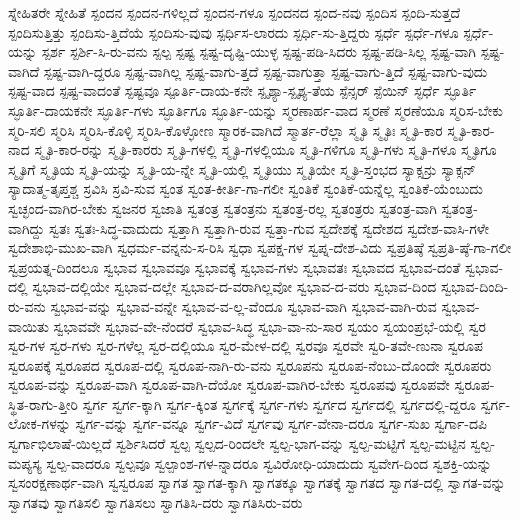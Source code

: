 {ಸ್ನೇಹಿತರೇ
ಸ್ನೇಹಿತೆ
ಸ್ಪಂದನ
ಸ್ಪಂದನ-ಗಳಿಲ್ಲದೆ
ಸ್ಪಂದನ-ಗಳೂ
ಸ್ಪಂದನದ
ಸ್ಪಂದ-ನವು
ಸ್ಪಂದಿಸ
ಸ್ಪಂದಿ-ಸುತ್ತದೆ
ಸ್ಪಂದಿಸುತ್ತಿತ್ತು
ಸ್ಪಂದಿಸು-ತ್ತಿದೆಯೆ
ಸ್ಪಂದಿಸು-ವುವು
ಸ್ಪರ್ಧಿಸ-ಲಾರದು
ಸ್ಪರ್ಧಿ-ಸು-ತ್ತಿದ್ದರು
ಸ್ಪರ್ಧೆ
ಸ್ಪರ್ಧೆ-ಗಳೂ
ಸ್ಪರ್ಧೆ-ಯನ್ನು
ಸ್ಪರ್ಶ
ಸ್ಪರ್ಶಿ-ಸಿ-ರು-ವನು
ಸ್ಪಲ್ಪ
ಸ್ಪಷ್ಟ
ಸ್ಪಷ್ಟ-ದೃಷ್ಟಿ-ಯುಳ್ಳ
ಸ್ಪಷ್ಟ-ಪಡಿ-ಸಿದರು
ಸ್ಪಷ್ಟ-ಪಡಿ-ಸಿಲ್ಲ
ಸ್ಪಷ್ಟ-ವಾಗಿ
ಸ್ಪಷ್ಟ-ವಾಗಿದೆ
ಸ್ಪಷ್ಟ-ವಾಗಿ-ದ್ದರೂ
ಸ್ಪಷ್ಟ-ವಾಗಿಲ್ಲ
ಸ್ಪಷ್ಟ-ವಾಗು-ತ್ತದೆ
ಸ್ಪಷ್ಟ-ವಾಗುತ್ತಾ
ಸ್ಪಷ್ಟ-ವಾಗು-ತ್ತಿದೆ
ಸ್ಪಷ್ಟ-ವಾಗು-ವುದು
ಸ್ಪಷ್ಟ-ವಾದ
ಸ್ಪಷ್ಟ-ವಾದಂತೆ
ಸ್ಪಷ್ಟವೂ
ಸ್ಪೂರ್ತಿ-ದಾಯ-ಕನೇ
ಸ್ಪೃಶ್ಯಾ-ಸ್ಪೃಶ್ಯ-ತೆಯ
ಸ್ಪೆನ್ಸರ್
ಸ್ಪೆಯಿನ್
ಸ್ಫರ್ಧೆ
ಸ್ಫೂರ್ತಿ
ಸ್ಫೂರ್ತಿ-ದಾಯಕನೇ
ಸ್ಫೂರ್ತಿ-ಗಳು
ಸ್ಫೂರ್ತಿಗೂ
ಸ್ಫೂರ್ತಿ-ಯನ್ನು
ಸ್ಮರಣಾರ್ಹ-ವಾದ
ಸ್ಮರಣೆ
ಸ್ಮರಣೆಯೂ
ಸ್ಮರಿಸ-ಬೇಕು
ಸ್ಮರಿ-ಸಲಿ
ಸ್ಮರಿಸಿ
ಸ್ಮರಿಸಿ-ಕೊಳ್ಳಿ
ಸ್ಮರಿಸಿ-ಕೊಳ್ಳೋಣ
ಸ್ಮಾರಕ-ವಾಗಿದೆ
ಸ್ಮಾರ್ತ-ರೆಲ್ಲಾ
ಸ್ಮೃತಿ
ಸ್ಮೃತಿಃ
ಸ್ಮೃತಿ-ಕಾರ
ಸ್ಮೃತಿ-ಕಾರ-ನಾದ
ಸ್ಮೃತಿ-ಕಾರ-ರನ್ನು
ಸ್ಮೃತಿ-ಕಾರರು
ಸ್ಮೃತಿ-ಗಳಲ್ಲಿ
ಸ್ಮೃತಿ-ಗಳಲ್ಲಿಯೂ
ಸ್ಮೃತಿ-ಗಳಿಗೂ
ಸ್ಮೃತಿ-ಗಳು
ಸ್ಮೃತಿ-ಗಳೂ
ಸ್ಮೃತಿಗೂ
ಸ್ಮೃತಿಗೆ
ಸ್ಮೃತಿಯ
ಸ್ಮೃತಿ-ಯನ್ನು
ಸ್ಮೃತಿ-ಯ-ನ್ನೇ
ಸ್ಮೃತಿ-ಯಲ್ಲಿ
ಸ್ಮೃತಿಯು
ಸ್ಮೃತಿಯೇ
ಸ್ಮೃತಿ-ಸ್ತಂಭದ
ಸ್ಯಾಕ್ಸನ್ರು
ಸ್ಯಾಕ್ಸನ್
ಸ್ಯಾದಾತ್ಮ-ತೃಪ್ತಶ್ಚ
ಸ್ರವಿಸಿ
ಸ್ರವಿ-ಸುವ
ಸ್ವಂತ
ಸ್ವಂತ-ಕೀರ್ತಿ-ಗಾ-ಗಲೀ
ಸ್ವಂತಿಕೆ
ಸ್ವಂತಿಕೆ-ಯನ್ನೆಲ್ಲ
ಸ್ವಂತಿಕೆ-ಯೆಂಬುದು
ಸ್ವಚ್ಛಂದ-ವಾಗಿರ-ಬೇಕು
ಸ್ವಜನರ
ಸ್ವಜಾತಿ
ಸ್ವತಂತ್ರ
ಸ್ವತಂತ್ರನು
ಸ್ವತಂತ್ರ-ರಲ್ಲ
ಸ್ವತಂತ್ರರು
ಸ್ವತಂತ್ರ-ವಾಗಿ
ಸ್ವತಂತ್ರ-ವಾಗಿದ್ದು
ಸ್ವತಃ
ಸ್ವತಃ-ಸಿದ್ಧ-ವಾದುದು
ಸ್ವತ್ತಾಗಿ
ಸ್ವತ್ತಾಗಿ-ರುವ
ಸ್ವತ್ತಾ-ಗುವ
ಸ್ವದೇಶಕ್ಕೆ
ಸ್ವದೇಶದ
ಸ್ವದೇಶ-ವಾಸಿ-ಗಳೇ
ಸ್ವದೇಶಾಭಿ-ಮುಖ-ವಾಗಿ
ಸ್ವಧರ್ಮ-ವನ್ನನು-ಸ-ರಿಸಿ
ಸ್ವಧಾ
ಸ್ವಪಕ್ಷ-ಗಳ
ಸ್ವಪ್ನ-ದೇಶ-ವಿದು
ಸ್ವಪ್ರತಿಷ್ಠೆ
ಸ್ವಪ್ರತಿ-ಷ್ಠೆ-ಗಾ-ಗಲೀ
ಸ್ವಪ್ರಯತ್ನ-ದಿಂದಲೂ
ಸ್ವಭಾವ
ಸ್ವಭಾವವೂ
ಸ್ವಭಾವಕ್ಕೆ
ಸ್ವಭಾವ-ಗಳು
ಸ್ವಭಾವತಃ
ಸ್ವಭಾವದ
ಸ್ವಭಾವ-ದಂತೆ
ಸ್ವಭಾವ-ದಲ್ಲಿ
ಸ್ವಭಾವ-ದಲ್ಲಿಯೇ
ಸ್ವಭಾವ-ದಲ್ಲೇ
ಸ್ವಭಾವ-ದ-ವರಾಗಿಲ್ಲವೋ
ಸ್ವಭಾವ-ದ-ವರು
ಸ್ವಭಾವ-ದಿಂದ
ಸ್ವಭಾವ-ದಿಂದಿ-ರು-ವನು
ಸ್ವಭಾವ-ವನ್ನು
ಸ್ವಭಾವ-ವನ್ನೇ
ಸ್ವಭಾವ-ವ-ಲ್ಲ-ವೆಂದೂ
ಸ್ವಭಾವ-ವಾಗಿ
ಸ್ವಭಾವ-ವಾಗಿ-ರುವ
ಸ್ವಭಾವ-ವಾಯಿತು
ಸ್ವಭಾವವೇ
ಸ್ವಭಾವ-ವೇ-ನೆಂದರೆ
ಸ್ವಭಾವ-ಸಿದ್ಧ
ಸ್ವಭಾ-ವಾ-ನು-ಸಾರ
ಸ್ವಯಂ
ಸ್ವಯಂಪ್ರಭೆ-ಯಲ್ಲಿ
ಸ್ವರ
ಸ್ವರ-ಗಳ
ಸ್ವರ-ಗಳು
ಸ್ವರ-ಗಳೆಲ್ಲ
ಸ್ವರ-ದಲ್ಲಿಯೂ
ಸ್ವರ-ಮೇಳ-ದಲ್ಲಿ
ಸ್ವರವೂ
ಸ್ವರವೇ
ಸ್ವರಿ-ತವೇ-ಣುನಾ
ಸ್ವರೂಪ
ಸ್ವರೂಪಕ್ಕೆ
ಸ್ವರೂಪದ
ಸ್ವರೂಪ-ದಲ್ಲಿ
ಸ್ವರೂಪ-ನಾಗಿ-ರು-ವನು
ಸ್ವರೂಪನು
ಸ್ವರೂಪ-ನೆಂಬು-ದೊಂದೇ
ಸ್ವರೂಪರು
ಸ್ವರೂಪ-ವನ್ನು
ಸ್ವರೂಪ-ವಾಗಿ
ಸ್ವರೂಪ-ವಾಗಿ-ದೆಯೋ
ಸ್ವರೂಪ-ವಾಗಿರ-ಬೇಕು
ಸ್ವರೂಪವು
ಸ್ವರೂಪವೇ
ಸ್ವರೂಪ-ಸ್ಥಿತ-ರಾಗು-ತ್ತೀರಿ
ಸ್ವರ್ಗ
ಸ್ವರ್ಗ-ಕ್ಕಾಗಿ
ಸ್ವರ್ಗ-ಕ್ಕಿಂತ
ಸ್ವರ್ಗಕ್ಕೆ
ಸ್ವರ್ಗ-ಗಳು
ಸ್ವರ್ಗದ
ಸ್ವರ್ಗದಲ್ಲಿ
ಸ್ವರ್ಗದಲ್ಲಿ-ದ್ದರೂ
ಸ್ವರ್ಗ-ಲೋಕ-ಗಳನ್ನು
ಸ್ವರ್ಗ-ವನ್ನು
ಸ್ವರ್ಗ-ವನ್ನೂ
ಸ್ವರ್ಗ-ವಿದೆ
ಸ್ವರ್ಗವು
ಸ್ವರ್ಗ-ವೇನಾ-ದರೂ
ಸ್ವರ್ಗ-ಸುಖ
ಸ್ವರ್ಗಾ-ದಪಿ
ಸ್ವರ್ಗಾಭಿಲಾಷೆ-ಯಿಲ್ಲದೆ
ಸ್ವರ್ಶಿಸಿದರೆ
ಸ್ವಲ್ಪ
ಸ್ವಲ್ಪದ-ರಿಂದಲೇ
ಸ್ವಲ್ಪ-ಭಾಗ-ವನ್ನು
ಸ್ವಲ್ಪ-ಮಟ್ಟಿಗೆ
ಸ್ವಲ್ಪ-ಮಟ್ಟಿನ
ಸ್ವಲ್ಪ-ಮಪ್ಯಸ್ಯ
ಸ್ವಲ್ಪ-ವಾದರೂ
ಸ್ವಲ್ಪವೂ
ಸ್ವಲ್ಪಾಂಶ-ಗಳ-ನ್ನಾದರೂ
ಸ್ವವಿರೋಧಿ-ಯಾದುದು
ಸ್ವವೇಗ-ದಿಂದ
ಸ್ವಶಕ್ತಿ-ಯನ್ನು
ಸ್ವಸಂರಕ್ಷಣಾರ್ಥ-ವಾಗಿ
ಸ್ವಸ್ವರೂಪ
ಸ್ವಾಗತ
ಸ್ವಾಗತ-ಕ್ಕಾಗಿ
ಸ್ವಾಗತಕ್ಕೂ
ಸ್ವಾಗತಕ್ಕೆ
ಸ್ವಾಗತದ
ಸ್ವಾಗತ-ದಲ್ಲಿ
ಸ್ವಾಗತ-ವನ್ನು
ಸ್ವಾಗತವು
ಸ್ವಾಗತಿಸಲಿ
ಸ್ವಾಗತಿಸಲು
ಸ್ವಾಗತಿಸಿ-ದರು
ಸ್ವಾಗತಿಸಿರು-ವರು
}
